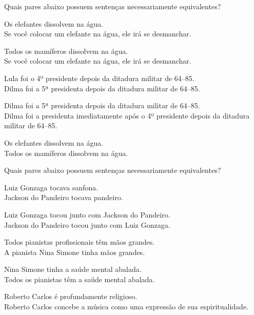 \problempart Quais pares abaixo possuem sentenças necessariamente equivalentes?

\begin{earg}
\item Os elefantes dissolvem na água.	\\
	Se você colocar um elefante na água, ele irá se desmanchar.
\item Todos os mamíferos dissolvem na água. \\		
	Se você colocar um elefante na água, ele irá se desmanchar. 
\item Lula foi o 4º presidente depois da ditadura militar de 64--85. \\
	 Dilma foi a 5ª presidenta depois da ditadura militar de 64--85. 
\item Dilma foi a 5ª presidenta depois da ditadura militar de 64--85. \\
	  Dilma foi a presidenta imediatamente após o 4º presidente depois da ditadura militar de 64--85.
\item Os elefantes dissolvem na água. 	\\	
	Todos os mamíferos dissolvem na água. 
\end{earg}

\problempart Quais pares abaixo possuem sentenças necessariamente equivalentes?

\begin{earg}
\item Luiz Gonzaga tocava sanfona. \\
	Jackson do Pandeiro tocava pandeiro.

\item Luiz Gonzaga tocou junto com Jackson do Pandeiro. \\
	Jackson do Pandeiro tocou junto com Luiz Gonzaga.

\item Todos pianistas profissionais têm mãos grandes. \\
	A pianista Nina Simone tinha mãos grandes.

\item Nina Simone tinha a saúde mental abalada. \\
	Todos os pianistas têm a saúde mental abalada.

\item Roberto Carlos é profundamente religioso. \\
	Roberto Carlos concebe a música como uma expressão de sua espiritualidade.
\end{earg}


